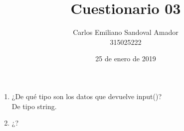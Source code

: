 \documentclass[letterpaper, 12pt, oneside]{article}%
\title{Cuestionario 03}
\author{Carlos Emiliano Sandoval Amador \\ 315025222}
\date{25 de enero de 2019}
\begin{document}
	\maketitle
	\begin{enumerate}
		\item ¿De qué tipo son los datos que devuelve input()? \\ De tipo string.
		\item ¿?
	\end{enumerate}
\end{document}
